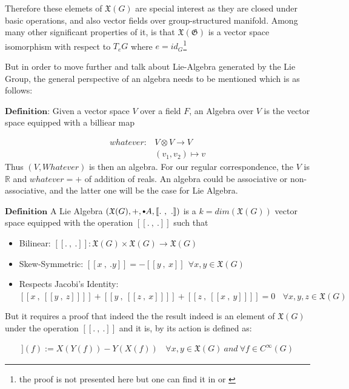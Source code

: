 \documentclass[8pt, twocoloumn]{article}
\begin{document}
 Therefore these elemets of $\mathfrak{X}(G)$ are special interest as they are closed under basic operations, and also vector fields over group-structured manifold. Among many other significant properties of it, is that $\mathfrak{X(G)}$ is a vector space isomorphism with respect to $T_eG$ where $e = id_{G}$\footnote{the proof is not presented here but one can find it in \cite{geomanatomy} or \cite{doeslie}}
 
 But in order to move further and talk about Lie-Algebra generated by the Lie Group, the general perspective of an algebra needs to be mentioned which is as follows: 
 
 $\textbf{Definition:}$ Given a vector space $V$ over a field $F$, an Algebra over $V$ is the vector space equipped with a billiear map 
 
 \begin{align}
     whatever:& V \otimes V \to V \\
     & (v_1, v_2) \mapsto v 
 \end{align}
 Thus $(V, Whatever)$ is then an algebra. For our regular correspondence, the $V$ is $\mathbb{R}$ and $whatever = +$ of addition of reals. An algebra could be associative or non-associative, and the latter one will be the case for Lie Algebra. 
 
 
 $\textbf{Definition}$ A Lie Algebra $(\mathfrak{X}(G), +, \sbullet[.75] A, [\![ . \ , \ . ]\!])$ is a $k=dim(\mathfrak{X}(G))$ vector space equipped with the operation $[\![ . \ , \ . ]\!]$ such that
\begin{itemize}
\item Bilinear: $[\![ . \ , \ . ]\!] : \mathfrak{X}(G) \times \mathfrak{X}(G) \to \mathfrak{X}(G)$
\item Skew-Symmetric: $[\![ x \ , \ .y]\!] = - [\![ y \ , \ x ]\!]  \ \ \forall x, y \in \mathfrak{X}(G) $
\item Respects Jacobi's Identity: $[\![ x \ , \ [\![ y \ , \ z ]\!]  ]\!] +[\![ y \ , \  [\![ z \ , \ x]\!] ]\!] +[\![ z \ , \ [\![ x\ , \ y ]\!]  ]\!] =0 \ \ \ \ \forall x, y, z \in \mathfrak{X}(G)$ 
\end{itemize} 
  But it requires a proof that indeed the the result indeed is an element of $\mathfrak{X}(G)$ under the operation $[\![ . \ , \ . ]\!] $ and it is, by its action is defined as: 
  
  \begin{align}
  [\![ X \ , \ Y ]\!](f) := X(Y(f)) - Y(X(f)) \ \ \ \  \forall x, y \in \mathfrak{X}(G) \ and \ \forall f \in C^{\infty}(G)
  \end{align}
  
\end{document}

